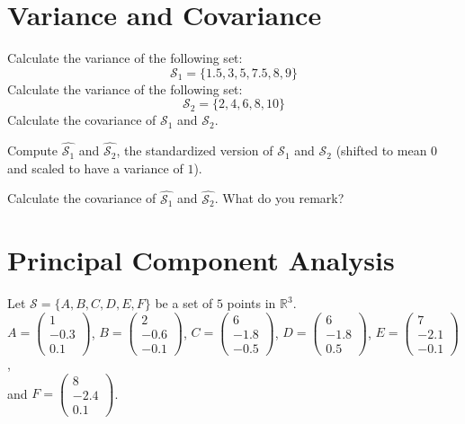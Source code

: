 \documentclass[]{article}
\begin{document}
	\section{Variance and Covariance}
	Calculate the variance of the following set:
	$$
	\mathcal{S}_1 = \{ 1.5, 3, 5, 7.5, 8, 9 \}
	$$
	Calculate the variance of the following set:
	$$
	\mathcal{S}_2 = \{ 2, 4, 6, 8, 10 \}
	$$
	Calculate the covariance of $\mathcal{S}_1$ and $\mathcal{S}_2$.
	
	Compute $\hat{\mathcal{S}_1}$ and $\hat{\mathcal{S}_2}$, the standardized version of $\mathcal{S}_1$ and $\mathcal{S}_2$ (shifted to mean $0$ and scaled to have a variance of $1$).
	
	Calculate the covariance of $\hat{\mathcal{S}_1}$ and $\hat{\mathcal{S}_2}$. What do you remark?

	\section{Principal Component Analysis}
	Let $\mathcal{S} = \{ A, B, C, D, E, F \}$ be a set of $5$ points in $\mathbb{R}^3$.\\
	$A = \begin{pmatrix} 1 \\ -0.3 \\ 0.1 \end{pmatrix}$,
	$B = \begin{pmatrix} 2 \\ -0.6 \\ -0.1 \end{pmatrix}$,
	$C = \begin{pmatrix} 6 \\ -1.8 \\ -0.5 \end{pmatrix}$,
	$D = \begin{pmatrix} 6 \\ -1.8 \\ 0.5 \end{pmatrix}$,
	$E = \begin{pmatrix} 7 \\ -2.1 \\ -0.1 \end{pmatrix}$,\\
	and $F = \begin{pmatrix} 8 \\ -2.4 \\ 0.1 \end{pmatrix}$.
	
\end{document}
